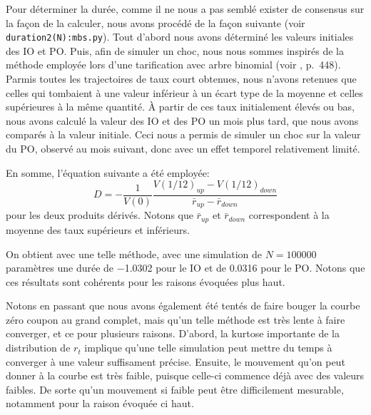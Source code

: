 Pour déterminer la durée, comme il ne nous a pas semblé exister de consensus sur la façon
de la calculer, nous avons procédé de la façon suivante (voir
\verb+duration2(N):mbs.py+). Tout d'abord nous avons déterminé les valeurs initiales des
IO et PO. Puis, afin de simuler un choc, nous nous sommes inspirés de la méthode employée
lors d'une tarification avec arbre binomial (voir \cite{veronesi}, p.~448). Parmis toutes
les trajectoires de taux court obtenues, nous n'avons retenues que celles qui tombaient à
une valeur inférieur à un écart type de la moyenne et celles supérieures à la même
quantité. À partir de ces taux initialement élevés ou bas, nous avons calculé la valeur
des IO et des PO un mois plus tard, que nous avons comparés à la valeur initiale. Ceci
nous a permis de simuler un choc sur la valeur du PO, observé au mois suivant, donc avec
un effet temporel relativement limité.

En somme, l'équation suivante a été employée:
\[
  D = -\frac{1}{V(0)}\frac{V(1/12)_{up} - V(1/12)_{down}}{\bar r_{up} - \bar r_{down}}
\]
pour les deux produits dérivés. Notons que $\bar r_{up}$ et $\bar r_{down}$ correspondent
à la moyenne des taux supérieurs et inférieurs.

On obtient avec une telle méthode, avec une simulation de $N=\num{100000}$ paramètres une
durée de \num{-1.0302} pour le IO et de \num{0.0316} pour le PO. Notons que ces résultats
sont cohérents pour les raisons évoquées plus haut.

Notons en passant que nous avons également été tentés de faire bouger la courbe zéro
coupon au grand complet, mais qu'un telle méthode est très lente à faire converger, et ce
pour plusieurs raisons. D'abord, la kurtose importante de la distribution de $r_t$
implique qu'une telle simulation peut mettre du temps à converger à une valeur suffisament
précise. Ensuite, le mouvement qu'on peut donner à la courbe est très faible, puisque
celle-ci commence déjà avec des valeurs faibles. De sorte qu'un mouvement si faible peut
être difficilement mesurable, notamment pour la raison évoquée ci haut. 






